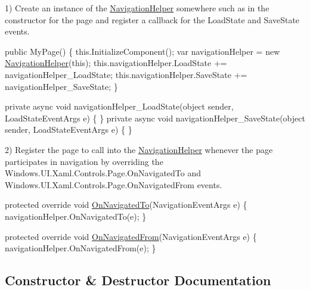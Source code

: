 1) Create an instance of the \hyperlink{class__1aarsproeve_1_1_common_1_1_navigation_helper}{Navigation\+Helper} somewhere such as in the constructor for the page and register a callback for the Load\+State and Save\+State events. 
\begin{DoxyCode}
\textcolor{keyword}{public} MyPage()
\{
    this.InitializeComponent();
    var navigationHelper = \textcolor{keyword}{new} \hyperlink{class__1aarsproeve_1_1_common_1_1_navigation_helper_af14c5526e239fb66aa413b026b555cdb}{NavigationHelper}(\textcolor{keyword}{this});
    this.navigationHelper.LoadState += navigationHelper\_LoadState;
    this.navigationHelper.SaveState += navigationHelper\_SaveState;
\}

\textcolor{keyword}{private} async \textcolor{keywordtype}{void} navigationHelper\_LoadState(\textcolor{keywordtype}{object} sender, LoadStateEventArgs e)
\{ \}
\textcolor{keyword}{private} async \textcolor{keywordtype}{void} navigationHelper\_SaveState(\textcolor{keywordtype}{object} sender, LoadStateEventArgs e)
\{ \}
\end{DoxyCode}


2) Register the page to call into the \hyperlink{class__1aarsproeve_1_1_common_1_1_navigation_helper}{Navigation\+Helper} whenever the page participates in navigation by overriding the Windows.\+U\+I.\+Xaml.\+Controls.\+Page.\+On\+Navigated\+To and Windows.\+U\+I.\+Xaml.\+Controls.\+Page.\+On\+Navigated\+From events. 
\begin{DoxyCode}
\textcolor{keyword}{protected} \textcolor{keyword}{override} \textcolor{keywordtype}{void} \hyperlink{class__1aarsproeve_1_1_common_1_1_navigation_helper_a592295e4be4ec349fd13c6d4700e32e2}{OnNavigatedTo}(NavigationEventArgs e)
\{
    navigationHelper.OnNavigatedTo(e);
\}

\textcolor{keyword}{protected} \textcolor{keyword}{override} \textcolor{keywordtype}{void} \hyperlink{class__1aarsproeve_1_1_common_1_1_navigation_helper_a0919c4c25dadbd1e73ec38691a6997fe}{OnNavigatedFrom}(NavigationEventArgs e)
\{
    navigationHelper.OnNavigatedFrom(e);
\}
\end{DoxyCode}
 

\subsection{Constructor \& Destructor Documentation}
\hypertarget{class__1aarsproeve_1_1_common_1_1_navigation_helper_af14c5526e239fb66aa413b026b555cdb}{}
